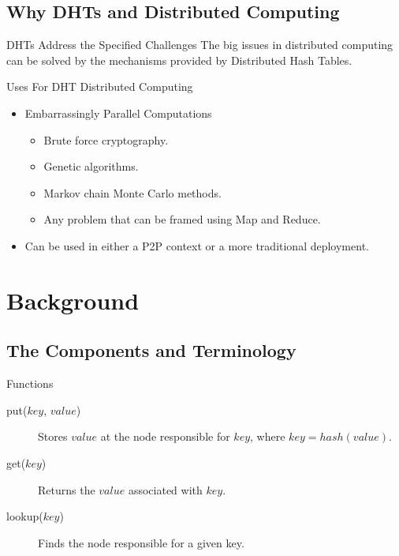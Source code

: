 \documentclass[11pt,aspectratio=169]{beamer}
\begin{document}
\subsection{Why DHTs and Distributed Computing}

\begin{frame}{DHTs Address the Specified Challenges}
The big issues in distributed computing can be solved by the mechanisms provided by Distributed Hash Tables.

\end{frame}

\begin{frame}{Uses For DHT Distributed Computing}
	\begin{itemize}
		\item Embarrassingly Parallel Computations
		\begin{itemize}
			\item Brute force cryptography.
			\item Genetic algorithms.
			\item Markov chain Monte Carlo methods.
			\item Any problem that can be framed using Map and Reduce.
		\end{itemize}
		\item Can be used in either a P2P context or a more traditional deployment.
	\end{itemize}
\end{frame}


\section{Background}

\subsection{The Components and Terminology}
\begin{frame}{Functions}
	\begin{description}
		\item[put($ key $, $ value $)] Stores $value$ at the node responsible for $key$, where $key =  hash(value)$.
		\item[get($ key $)] Returns the $ value $ associated with $key$.
		\item[lookup($ key $)] Finds the node responsible for a given key.
	\end{description}
\end{frame}
\end{document}
